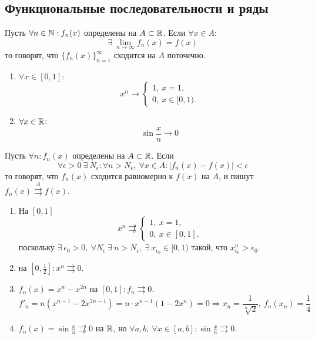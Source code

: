 \subsection{Функциональные последовательности и ряды}
\begin{definition}
    Пусть $\forall n\in \mathbb{N}: f_n(x)$ определены на $A\subset \mathbb{R}$. Если $\forall x\in A$: 
    \[\exists\ \lim\limits_{n\to\infty}f_n(x)=f(x)\]
    то говорят, что $\{f_n(x)\}_{n=1}^{\infty}$ сходится на $A$ поточечно.
\end{definition}
\begin{examples}\tab
    \begin{enumerate}
        \item $\forall x\in[0,1]$:
        \[x^n\to \begin{cases}
            1,\ x=1,\\
            0,\ x\in [0,1).
        \end{cases}\]
        \item $\forall x\in \mathbb{R}$:
        \[\sin{\frac{x}{n}}\to 0\]
    \end{enumerate}
\end{examples}
\begin{definition}
    Пусть $\forall n: f_n(x)$ определены на $A\subset \mathbb{R}$. Если 
    \[\forall \epsilon>0\ \exists\ N_{\epsilon}: \forall n>N_{\epsilon},\ \forall x\in A: |f_n(x)-f(x)|<\epsilon\]
    то говорят, что $f_n(x)$ сходится равномерно к $f(x)$ на $A$, и пишут $f_n(x)\overset{A}\rightrightarrows f(x)$.
\end{definition}
\begin{examples}\tab
    \begin{enumerate}
        \item На $[0,1]$
        \[x^n \not\rightrightarrows \begin{cases}
            1,\ x=1,\\
            0,\ x\in [0,1].
        \end{cases} \]
        поскольку $\exists\ \epsilon_0>0,\ \forall N_{\epsilon}\ \exists\ n>N_{\epsilon},\ \exists\ x_{\epsilon_0}\in [0,1)$ такой, что $x_{\epsilon_0}^n>\epsilon_0$.
        \item на $[0,\frac{1}{2}]: x^n\rightrightarrows 0$.
        \item $f_n(x)=x^n-x^{2n}$ на $[0,1]: f_n\rightrightarrows 0$.
        \[f'_n=n(x^{n-1}-2x^{2n-1})=n\cdot x^{n-1}(1-2x^n)=0 \Rightarrow x_n=\frac{1}{\sqrt[n]{2}},\ f_n(x_n)=\frac{1}{4}\]
        \item $f_n(x)=\sin{\frac{x}{n}} \not\rightrightarrows 0$ на $\mathbb{R}$, но $\forall a,b,\ \forall x\in [a,b]: \sin{\frac{x}{n}}\rightrightarrows 0$.
    \end{enumerate}
\end{examples}
